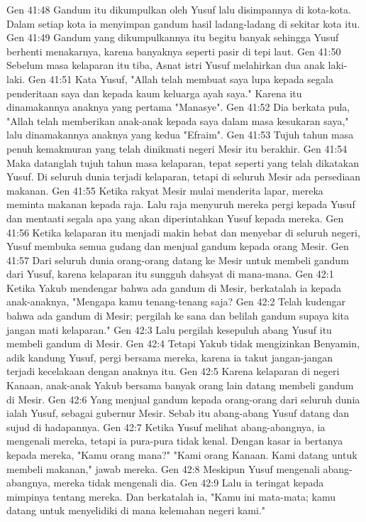 Gen 41:48  Gandum itu dikumpulkan oleh Yusuf lalu disimpannya di kota-kota. Dalam setiap kota ia menyimpan gandum hasil ladang-ladang di sekitar kota itu.
Gen 41:49  Gandum yang dikumpulkannya itu begitu banyak sehingga Yusuf berhenti menakarnya, karena banyaknya seperti pasir di tepi laut.
Gen 41:50  Sebelum masa kelaparan itu tiba, Asnat istri Yusuf melahirkan dua anak laki-laki.
Gen 41:51  Kata Yusuf, "Allah telah membuat saya lupa kepada segala penderitaan saya dan kepada kaum keluarga ayah saya." Karena itu dinamakannya anaknya yang pertama "Manasye".
Gen 41:52  Dia berkata pula, "Allah telah memberikan anak-anak kepada saya dalam masa kesukaran saya," lalu dinamakannya anaknya yang kedua "Efraim".
Gen 41:53  Tujuh tahun masa penuh kemakmuran yang telah dinikmati negeri Mesir itu berakhir.
Gen 41:54  Maka datanglah tujuh tahun masa kelaparan, tepat seperti yang telah dikatakan Yusuf. Di seluruh dunia terjadi kelaparan, tetapi di seluruh Mesir ada persediaan makanan.
Gen 41:55  Ketika rakyat Mesir mulai menderita lapar, mereka meminta makanan kepada raja. Lalu raja menyuruh mereka pergi kepada Yusuf dan mentaati segala apa yang akan diperintahkan Yusuf kepada mereka.
Gen 41:56  Ketika kelaparan itu menjadi makin hebat dan menyebar di seluruh negeri, Yusuf membuka semua gudang dan menjual gandum kepada orang Mesir.
Gen 41:57  Dari seluruh dunia orang-orang datang ke Mesir untuk membeli gandum dari Yusuf, karena kelaparan itu sungguh dahsyat di mana-mana.
Gen 42:1  Ketika Yakub mendengar bahwa ada gandum di Mesir, berkatalah ia kepada anak-anaknya, "Mengapa kamu tenang-tenang saja?
Gen 42:2  Telah kudengar bahwa ada gandum di Mesir; pergilah ke sana dan belilah gandum supaya kita jangan mati kelaparan."
Gen 42:3  Lalu pergilah kesepuluh abang Yusuf itu membeli gandum di Mesir.
Gen 42:4  Tetapi Yakub tidak mengizinkan Benyamin, adik kandung Yusuf, pergi bersama mereka, karena ia takut jangan-jangan terjadi kecelakaan dengan anaknya itu.
Gen 42:5  Karena kelaparan di negeri Kanaan, anak-anak Yakub bersama banyak orang lain datang membeli gandum di Mesir.
Gen 42:6  Yang menjual gandum kepada orang-orang dari seluruh dunia ialah Yusuf, sebagai gubernur Mesir. Sebab itu abang-abang Yusuf datang dan sujud di hadapannya.
Gen 42:7  Ketika Yusuf melihat abang-abangnya, ia mengenali mereka, tetapi ia pura-pura tidak kenal. Dengan kasar ia bertanya kepada mereka, "Kamu orang mana?" "Kami orang Kanaan. Kami datang untuk membeli makanan," jawab mereka.
Gen 42:8  Meskipun Yusuf mengenali abang-abangnya, mereka tidak mengenali dia.
Gen 42:9  Lalu ia teringat kepada mimpinya tentang mereka. Dan berkatalah ia, "Kamu ini mata-mata; kamu datang untuk menyelidiki di mana kelemahan negeri kami."
